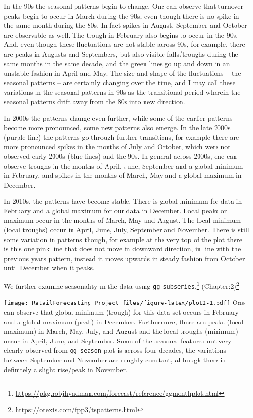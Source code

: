 \documentclass[
]{article}
\begin{document}
In the 90s the seasonal patterns begin to change. One can observe that
turnover peaks begin to occur in March during the 90s, even though there
is no spike in the same month during the 80s. In fact spikes in August,
September and October are observable as well. The trough in February
also begins to occur in the 90s. And, even though these fluctuations are
not stable across 90s, for example, there are peaks in Augusts and
Septembers, but also visible falls/troughs during the same months in the
same decade, and the green lines go up and down in an unstable fashion
in April and May. The size and shape of the fluctuations -- the seasonal
patterns -- are certainly changing over the time, and I may call these
variations in the seasonal patterns in 90s as the transitional period
wherein the seasonal patterns drift away from the 80s into new
direction.

In 2000s the patterns change even further, while some of the earlier
patterns become more pronounced, some new patterns also emerge. In the
late 2000s (purple line) the patterns go through further transitions,
for example there are more pronounced spikes in the months of July and
October, which were not observed early 2000s (blue lines) and the 90s.
In general across 2000s, one can observe troughs in the months of April,
June, September and a global minimum in February, and spikes in the
months of March, May and a global maximum in December.

In 2010s, the patterns have become stable. There is global minimum for
data in February and a global maximum for our data in December. Local
peaks or maximum occur in the months of March, May and August. The local
minimum (local troughs) occur in April, June, July, September and
November. There is still some variation in patterns though, for example
at the very top of the plot there is this one pink line that does not
move in downward direction, in line with the previous years pattern,
instead it moves upwards in steady fashion from October until December
when it peaks.

We further examine seasonality in the data using
\texttt{gg\_subseries}.\footnote{\url{https://pkg.robjhyndman.com/forecast/reference/ggmonthplot.html}}
(Chapter:2)\footnote{\url{https://otexts.com/fpp3/tspatterns.html}}

\texttt{[image: RetailForecasting\_Project\_files/figure-latex/plot2-1.pdf]}
One can observe that global minimum (trough) for this data set occurs in
February and a global maximum (peak) in December. Furthermore, there are
peaks (local maximum) in March, May, July, and August and the local
troughs (minimum) occur in April, June, and September. Some of the
seasonal features not very clearly observed from \texttt{gg\_season}
plot is across four decades, the variations between September and
November are roughly constant, although there is definitely a slight
rise/peak in November.
\end{document}
